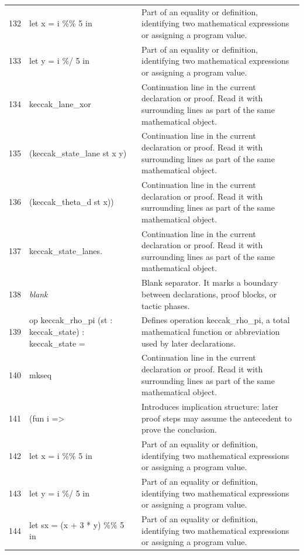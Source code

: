 \documentclass[10pt]{article}
\begin{document}
\begin{longtable}{r L{0.53\textwidth} L{0.37\textwidth}}
132 & {\ttfamily\scriptsize        let x = i \%\% 5 in} & Part of an equality or definition, identifying two mathematical expressions or assigning a program value. \\
133 & {\ttfamily\scriptsize        let y = i \%/ 5 in} & Part of an equality or definition, identifying two mathematical expressions or assigning a program value. \\
134 & {\ttfamily\scriptsize        keccak\_lane\_xor} & Continuation line in the current declaration or proof.  Read it with surrounding lines as part of the same mathematical object. \\
135 & {\ttfamily\scriptsize          (keccak\_state\_lane st x y)} & Continuation line in the current declaration or proof.  Read it with surrounding lines as part of the same mathematical object. \\
136 & {\ttfamily\scriptsize          (keccak\_theta\_d st x))} & Continuation line in the current declaration or proof.  Read it with surrounding lines as part of the same mathematical object. \\
137 & {\ttfamily\scriptsize     keccak\_state\_lanes.} & Continuation line in the current declaration or proof.  Read it with surrounding lines as part of the same mathematical object. \\
138 & {\ttfamily\scriptsize \emph{blank}} & Blank separator.  It marks a boundary between declarations, proof blocks, or tactic phases. \\
139 & {\ttfamily\scriptsize op keccak\_rho\_pi (st : keccak\_state) : keccak\_state =} & Defines operation keccak\_rho\_pi, a total mathematical function or abbreviation used by later declarations. \\
140 & {\ttfamily\scriptsize   mkseq} & Continuation line in the current declaration or proof.  Read it with surrounding lines as part of the same mathematical object. \\
141 & {\ttfamily\scriptsize     (fun i =>} & Introduces implication structure: later proof steps may assume the antecedent to prove the conclusion. \\
142 & {\ttfamily\scriptsize        let x = i \%\% 5 in} & Part of an equality or definition, identifying two mathematical expressions or assigning a program value. \\
143 & {\ttfamily\scriptsize        let y = i \%/ 5 in} & Part of an equality or definition, identifying two mathematical expressions or assigning a program value. \\
144 & {\ttfamily\scriptsize        let sx = (x + 3 * y) \%\% 5 in} & Part of an equality or definition, identifying two mathematical expressions or assigning a program value. \\

\end{longtable}
\end{document}
